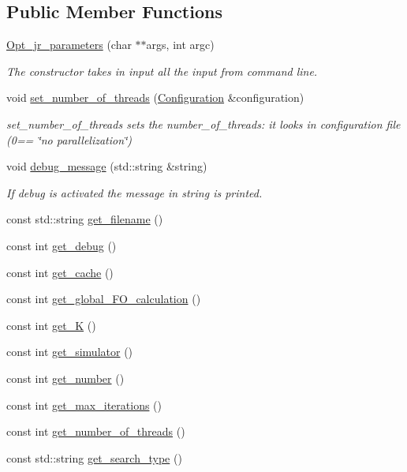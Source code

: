 \subsection*{Public Member Functions}
\begin{DoxyCompactItemize}
\item 
\hyperlink{classOpt__jr__parameters_aae142f498b266523f275dba7a407326d}{Opt\-\_\-jr\-\_\-parameters} (char $\ast$$\ast$args, int argc)
\begin{DoxyCompactList}\small\item\em The constructor takes in input all the input from command line. \end{DoxyCompactList}\item 
void \hyperlink{classOpt__jr__parameters_a19769e398ca6969a851cc6584cfa4dd0}{set\-\_\-number\-\_\-of\-\_\-threads} (\hyperlink{classConfiguration}{Configuration} \&configuration)
\begin{DoxyCompactList}\small\item\em set\-\_\-number\-\_\-of\-\_\-threads sets the number\-\_\-of\-\_\-threads\-: it looks in configuration file (0== \char`\"{}no parallelization\char`\"{}) \end{DoxyCompactList}\item 
void \hyperlink{classOpt__jr__parameters_a860bf209221b6c5e1c4394d1ae4a058f}{debug\-\_\-message} (std\-::string \&string)
\begin{DoxyCompactList}\small\item\em If debug is activated the message in string is printed. \end{DoxyCompactList}\item 
const std\-::string \hyperlink{classOpt__jr__parameters_a7cef75cfec6d554805e311d7b4c37ef2}{get\-\_\-filename} ()
\item 
const int \hyperlink{classOpt__jr__parameters_ae22fb9f311cca37788ea5cf054e83aa7}{get\-\_\-debug} ()
\item 
const int \hyperlink{classOpt__jr__parameters_a38b9495684e078740fc009c7a25ef643}{get\-\_\-cache} ()
\item 
const int \hyperlink{classOpt__jr__parameters_a5437ef881f921ae81f5e3d93fbac7e2a}{get\-\_\-global\-\_\-\-F\-O\-\_\-calculation} ()
\item 
const int \hyperlink{classOpt__jr__parameters_a8b6c548de42e286a8848b198280aa2dc}{get\-\_\-\-K} ()
\item 
const int \hyperlink{classOpt__jr__parameters_a198ee52d6e6bd479255e57f3fe12af0b}{get\-\_\-simulator} ()
\item 
const int \hyperlink{classOpt__jr__parameters_a8bafd6844417b1f64ddefcf84fb726cb}{get\-\_\-number} ()
\item 
const int \hyperlink{classOpt__jr__parameters_a4666611fbf651a76876a0356ad204df1}{get\-\_\-max\-\_\-iterations} ()
\item 
const int \hyperlink{classOpt__jr__parameters_a186166286122c263aac7bb8fe56d6751}{get\-\_\-number\-\_\-of\-\_\-threads} ()
\item 
const std\-::string \hyperlink{classOpt__jr__parameters_a77f9d51e7183e9af98e6211f444ed6b4}{get\-\_\-search\-\_\-type} ()
\end{DoxyCompactItemize}
